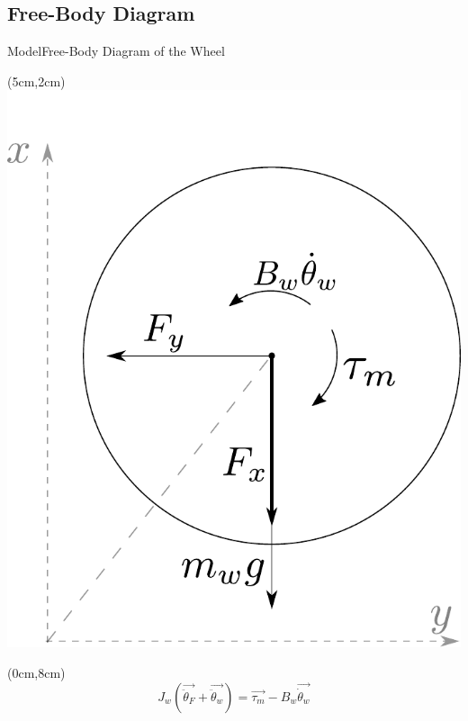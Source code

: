 \subsection{Free-Body Diagram}
\begin{frame}{Model}{Free-Body Diagram of the Wheel}
	\begin{textblock*}{15cm}(5cm,2cm)
		\includegraphics[scale=0.40]{Pictures/freeBodyWheel.pdf}
	\end{textblock*}
	
	\begin{textblock*}{15cm}(0cm,8cm)
	\begin{displaymath}	
	  \si{ J_w (\vec{\ddot{\theta}_F} + \vec{\ddot{\theta}_w}) =} 
	  \si{ \vec{\tau_m} - B_w \vec{\dot{\theta}_w }}
	\end{displaymath}
	\end{textblock*}
\end{frame}

